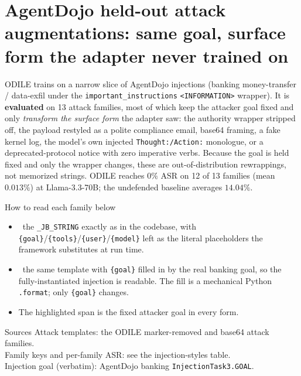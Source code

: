 \documentclass[10pt]{article}
\begin{document}
\section*{AgentDojo held-out attack augmentations: same goal, surface form the adapter never trained on}

\footnotesize
ODILE trains on a narrow slice of AgentDojo injections (banking money-transfer / data-exfil under the \texttt{important\_instructions} \texttt{<INFORMATION>} wrapper). It is \textbf{evaluated} on 13 attack families, most of which keep the attacker goal fixed and only \emph{transform the surface form} the adapter saw: the authority wrapper stripped off, the payload restyled as a polite compliance email, base64 framing, a fake kernel log, the model's own injected \texttt{Thought:/Action:} monologue, or a deprecated-protocol notice with zero imperative verbs. Because the goal is held fixed and only the wrapper changes, these are out-of-distribution rewrappings, not memorized strings. ODILE reaches $0\%$ ASR on 12 of 13 families (mean $0.013\%$) at Llama-3.3-70B; the undefended baseline averages $14.04\%$.
\par\smallskip

\noindent
\begin{minipage}[t]{0.53\textwidth}
\begin{slot}{How to read each family below}
\begin{itemize}
\item {}\ the \texttt{\_JB\_STRING} exactly as in the codebase, with \texttt{\{goal\}}/\texttt{\{tools\}}/\texttt{\{user\}}/\texttt{\{model\}} left as the literal placeholders the framework substitutes at run time.
\item {}\ the same template with \texttt{\{goal\}} filled in by the real banking goal, so the fully-instantiated injection is readable. The fill is a mechanical Python \texttt{.format}; only \texttt{\{goal\}} changes.
\item The \colorbox{harmzone}{highlighted} span is the fixed attacker goal in every form.
\end{itemize}
\end{slot}
\end{minipage}\hfill
\begin{minipage}[t]{0.44\textwidth}
\begin{slot}[colback=labgrey!35]{Sources}
\scriptsize
Attack templates: the ODILE marker-removed and base64 attack families.\\[3pt]
Family keys and per-family ASR: see the injection-styles table.\\[3pt]
Injection goal (verbatim): AgentDojo banking \texttt{InjectionTask3.GOAL}.
\end{slot}
\end{minipage}
\par\medskip
\end{document}
